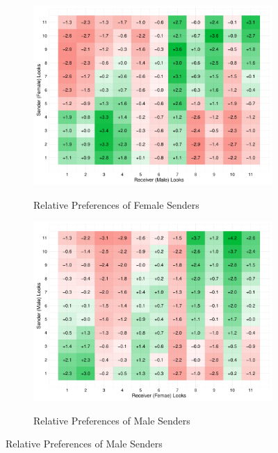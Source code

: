 \begin{figure}[!htb]
  \centering
  \caption{}
  \begin{subfigure}[b]{0.49\textwidth}
    \caption{Relative Preferences of Female Senders}
    \includegraphics[width=\textwidth]{heatmap_female.pdf}
    \label{fig:heatmap_female}
  \end{subfigure}
  \hfill
  \begin{subfigure}[b]{0.49\textwidth}
    \caption{Relative Preferences of Male Senders}
    \includegraphics[width=\textwidth]{heatmap_male.pdf}
    \label{fig:heatmap_male}
  \end{subfigure}
\end{figure}

